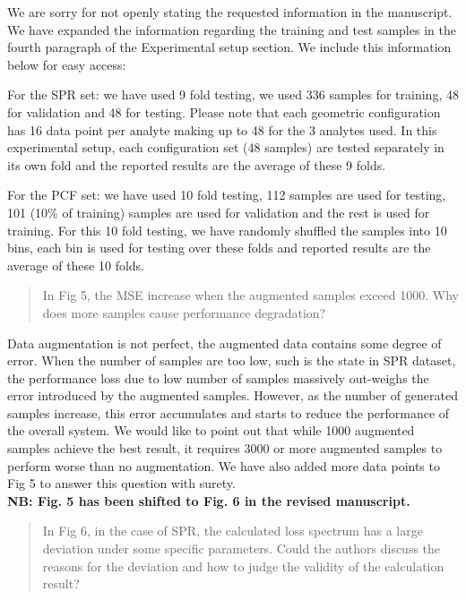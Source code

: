 \documentclass{article}
\begin{document}
	We are sorry for not openly stating the requested information in the manuscript. We have expanded the information regarding the training and test samples in the fourth paragraph of the Experimental setup section. We include this information below for easy access:
	
	For the SPR set: we have used 9 fold testing, we used 336 samples for training, 48 for validation and 48 for testing. Please note that each geometric configuration has 16 data point per analyte making up to 48 for the 3 analytes used. In this experimental setup, each configuration set (48 samples) are tested separately in its own fold and the reported results are the average of these 9 folds.
	
	For the PCF set: we have used 10 fold testing, 112 samples are used for testing, 101 (10\% of training) samples are used for validation and the rest is used for training. For this 10 fold testing, we have randomly shuffled the samples into 10 bins, each bin is used for testing over these folds and reported results are the average of these 10 folds.
	
	\begin{quote}
	In Fig 5, the MSE increase when the augmented samples exceed 1000. Why does more samples cause performance degradation?
	\end{quote}
	
	Data augmentation is not perfect, the augmented data contains some degree of error. When the number of samples are too low, such is the state in SPR dataset, the performance loss due to low number of samples massively out-weighs the error introduced by the augmented samples. However, as the number of generated samples increase, this error accumulates and starts to reduce the performance of the overall system. We would like to point out that while 1000 augmented samples achieve the best result, it requires 3000 or more augmented samples to perform worse than no augmentation. We have also added more data points to Fig 5 to answer this question with surety.\\
	
	\textbf{NB: Fig. 5 has been shifted to Fig. 6 in the revised manuscript.}
	
	\begin{quote}
	In Fig 6, in the case of SPR, the calculated loss spectrum has a large deviation under some specific parameters. Could the authors discuss the reasons for the deviation and how to judge the validity of the calculation result?
	\end{quote}
	
\end{document}
